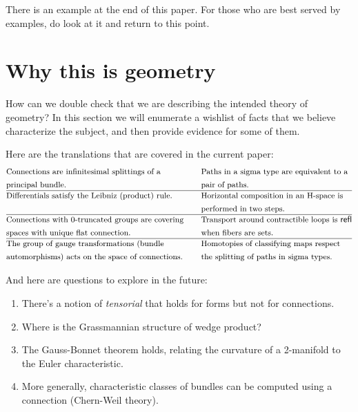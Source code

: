 \documentclass[12pt]{article}
\begin{document}
There is an example at the end of this paper. For those who are best served by examples, do look at it and return to this point.

\section{Why this is geometry}

How can we double check that we are describing the intended theory of geometry? In this section we will enumerate a wishlist of facts that we believe characterize the subject, and then provide evidence for some of them.

Here are the translations that are covered in the current paper:
\begin{align*}
& \text{\small Connections are infinitesimal splittings of a} & \quad &\text{\small Paths in a sigma type are equivalent to a}        \\
& \text{\small principal bundle.} & \quad&\text{\small pair of paths.}        \\ \hline
& \text{\small Differentials satisfy the Leibniz (product) rule.} &\quad  &\text{\small Horizontal composition in an H-space is} \\ 
&  &  \quad&\text{\small performed in two steps.} \\ \hline
& \text{\small Connections with 0-truncated groups are covering}        &\quad &\text{\small Transport around contractible loops is } \mathsf{refl}             \\ 
& \text{\small spaces with unique flat connection.}        & \quad&\text{\small when fibers are sets.}             \\ \hline
& \text{\small The group of gauge transformations (bundle} &\quad &\text{\small Homotopies of classifying maps respect } \\ 
& \text{\small automorphisms) acts on the space of connections.} & \quad&\text{\small the splitting of paths in sigma types.} \\ 
\end{align*}

And here are questions to explore in the future:
\begin{enumerate}
\item There's a notion of \emph{tensorial} that holds for forms but not for connections.
\item Where is the Grassmannian structure of wedge product?
\item The Gauss-Bonnet theorem holds, relating the curvature of a 2-manifold to the Euler characteristic.
\item More generally, characteristic classes of bundles can be computed using a connection (Chern-Weil theory).
\end{enumerate}
\end{document}
